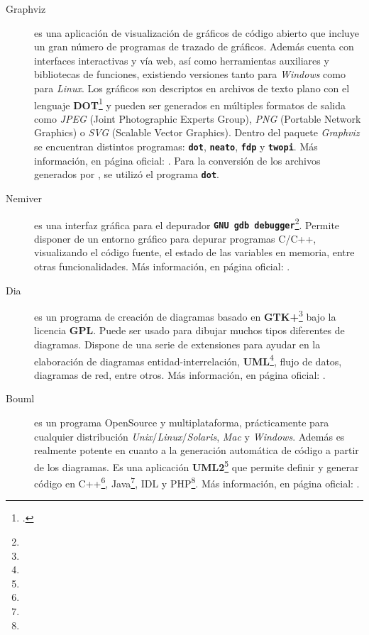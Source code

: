 \begin{description}
\item [Graphviz] es una aplicación de visualización de gráficos de código abierto que incluye un gran número de programas de trazado de gráficos. Además cuenta con interfaces interactivas y vía web, así como herramientas auxiliares y bibliotecas de funciones, existiendo versiones tanto para \textit{Windows} como para \textit{Linux}. Los gráficos son descriptos en archivos de texto plano con el lenguaje \textbf{DOT}\footnote{.} y pueden ser generados en múltiples formatos de salida como \textit{JPEG} (Joint Photographic Experts Group), \textit{PNG} (Portable Network Graphics) o \textit{SVG} (Scalable Vector Graphics). Dentro del paquete \textit{Graphviz} se encuentran distintos programas: \textbf{\texttt{dot}}, \textbf{\texttt{neato}}, \textbf{\texttt{fdp}} y \textbf{\texttt{twopi}}. Más información, en página oficial: .
Para la conversión de los archivos generados por \maggen, se utilizó el programa \texttt{\textbf{dot}}.

\item [Nemiver] es una interfaz gráfica para el depurador \texttt{\textbf{GNU gdb debugger}}\footnote{}. Permite disponer de un entorno gráfico para depurar programas C/C++, visualizando el código fuente, el estado de las variables en memoria, entre otras funcionalidades. Más información, en página oficial: .

\item [Dia] es un programa de creación de diagramas basado en \textbf{GTK+}\footnote{} bajo la licencia \textbf{GPL}. Puede ser usado para dibujar muchos tipos diferentes de diagramas. Dispone de una serie de extensiones para ayudar en la elaboración de diagramas entidad-interrelación, \textbf{UML}\footnote{}, flujo de datos, diagramas de red, entre otros. Más información, en página oficial: .

\item[Bouml] es un programa OpenSource y multiplataforma, prácticamente para cualquier distribución \textit{Unix}/\textit{Linux}/\textit{Solaris}, \textit{Mac} y \textit{Windows}. Además es realmente potente en cuanto a la generación automática de código a partir de los diagramas. Es una aplicación \textbf{UML2}\footnote{} que permite definir y generar código en C++\footnote{}, Java\footnote{}, IDL y PHP\footnote{}. Más información, en página oficial: .


\end{description}
